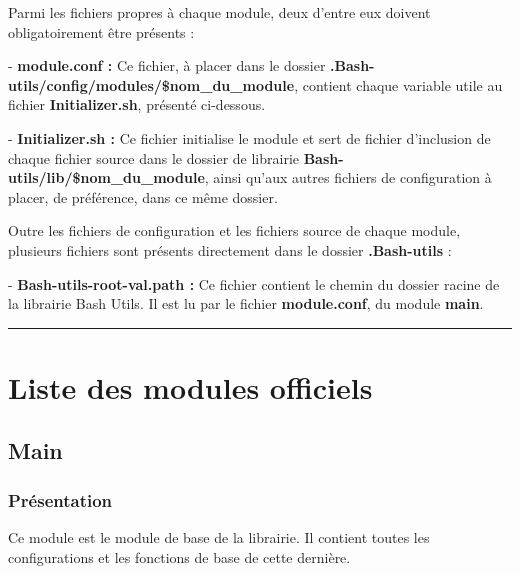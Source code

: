 \documentclass[a4paper,10pt]{article}
\begin{document}
  Parmi les fichiers propres à chaque module, deux d'entre eux doivent obligatoirement être présents :\linebreak

  - \textbf{\color{lime}module.conf\color{white} :} Ce fichier, à placer dans le dossier \textbf{\color{lime}.Bash-utils/config/modules/\$nom\_du\_module\color{white}}, contient chaque variable utile au fichier \textbf{\color{lime}Initializer.sh\color{white}}, présenté ci-dessous.\linebreak

  - \textbf{\color{lime}Initializer.sh\color{white} :} Ce fichier initialise le module et sert de fichier d'inclusion de chaque fichier source dans le dossier de librairie \textbf{\color{lime}Bash-utils/lib/\$nom\_du\_module\color{white}}, ainsi qu'aux autres fichiers de configuration à placer, de préférence, dans ce même dossier.\linebreak

  Outre les fichiers de configuration et les fichiers source de chaque module, plusieurs fichiers sont présents directement dans le dossier \textbf{\color{lime}.Bash-utils\color{white}} :\linebreak

  - \textbf{\color{lime}Bash-utils-root-val.path\color{white} :} Ce fichier contient le chemin du dossier racine de la librairie Bash Utils. Il est lu par le fichier \textbf{\color{lime}module.conf\color{white}}, du module \color{lime}\textbf{main\color{white}}.\\[1\baselineskip]



  \color{red}\par\noindent\rule{\textwidth}{0.4pt}\color{white}

 \color{red}
 \section{Liste des modules officiels}\color{white}

  \color{green}
  \subsection{Main}\color{white}

  \color{blue}
  \subsubsection{Présentation}\color{white}
  Ce module est le module de base de la librairie. Il contient toutes les configurations et les fonctions de base de cette dernière.
\end{document}
